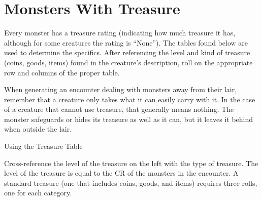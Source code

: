 
\section{Monsters With Treasure}

Every monster has a treasure rating (indicating how much treasure it has, although 
for some creatures the rating is ``None''). The tables found below are used to 
determine the specifics. After referencing the level and kind of treasure (coins, 
goods, items) found in the creature's description, roll on the appropriate row 
and columns of the proper table.

When generating an encounter dealing with monsters away from their lair, remember 
that a creature only takes what it can easily carry with it. In the case of a creature 
that cannot use treasure, that generally means nothing. The monster safeguards 
or hides its treasure as well as it can, but it leaves it behind when outside the 
lair.

\vspace{12pt}
Using the Treasure Table

Cross-reference the level of the treasure on the left with the type of treasure. 
The level of the treasure is equal to the CR of the monsters in the encounter. 
A standard treasure (one that includes coins, goods, and items) requires three 
rolls, one for each category.

